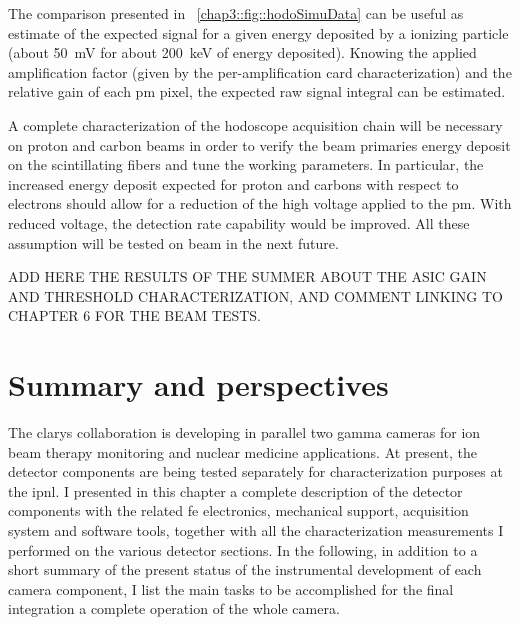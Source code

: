 The comparison presented in \figurename~\ref{chap3::fig::hodoSimuData} can be useful as estimate of the expected signal for a given energy deposited by a ionizing particle (about 50~mV for about 200~keV of energy deposited). Knowing the applied amplification factor (given by the per-amplification card characterization) and the relative gain of each \gls{pm} pixel, the expected raw signal integral can be estimated.

A complete characterization of the hodoscope acquisition chain will be necessary on proton and carbon beams in order to verify the beam primaries energy deposit on the scintillating fibers and tune the working parameters. In particular, the increased energy deposit expected for proton and carbons with respect to electrons should allow for a reduction of the high voltage applied to the \gls{pm}. With reduced voltage, the detection rate capability would be improved. All these assumption will be tested on beam in the next future.

ADD HERE THE RESULTS OF THE SUMMER ABOUT THE ASIC GAIN AND THRESHOLD CHARACTERIZATION, AND COMMENT LINKING TO CHAPTER 6 FOR THE BEAM TESTS. 



\section{Summary and perspectives}\label{chap3::sec::Next}

The \gls{clarys} collaboration is developing in parallel two gamma cameras for ion beam therapy monitoring and nuclear medicine applications. At present, the detector components are being tested separately for characterization purposes at the \gls{ipnl}. I presented in this chapter a complete description of the detector components with the related \gls{fe} electronics, mechanical support, acquisition system and software tools, together with all the characterization measurements I performed on the various detector sections. In the following, in addition to a short summary of the present status of the instrumental development of each camera component, I list the main tasks to be accomplished for the final integration a complete operation of the whole camera. 

